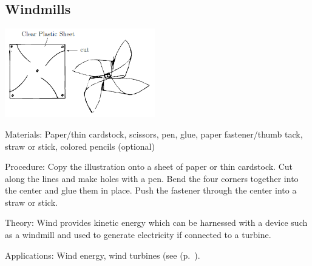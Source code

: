 \begin{multicols}{2}
\subsection{Windmills}

\begin{center}
\includegraphics[width=0.49\textwidth]{./img/windmill.png}
\end{center}

\begin{description*}
\item[Materials:]{Paper/thin cardstock, scissors, pen, glue, paper fastener/thumb tack, straw or stick, colored pencils (optional)}
\item[Procedure:]{Copy the illustration onto a sheet of paper or thin cardstock. Cut along the lines and make holes with a pen. Bend the four corners together into the center and glue them in place. Push the fastener through the center into a straw or stick.}
\item[Theory:]{Wind provides kinetic energy which can be harnessed with a device such as a windmill and used to generate electricity if connected to a turbine.}
\item[Applications:]{Wind energy, wind turbines (see  (p.~\pageref{sec:electromagnetism}).}
\end{description*}




\end{multicols}

\pagebreak